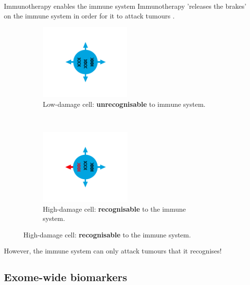 \documentclass{beamer}
\begin{document}
\begin{frame}{Immunotherapy enables the immune system}
Immunotherapy 'releases the brakes' on the immune system in order for it to attack tumours \citep{pardoll_blockade_2012}.
\begin{figure}[t!]
    \centering
    \begin{subfigure}[t]{0.45\textwidth}
        \centering
        \includegraphics[height=1.5in]{../results/figures/IC1.png}
        \caption{Low-damage cell: \textbf{unrecognisable} to immune system.}
    \end{subfigure}
    ~ 
    \begin{subfigure}[t]{0.45\textwidth}
        \centering
        \includegraphics[height=1.5in]{../results/figures/IC2.png}
        \caption{High-damage cell: \textbf{recognisable} to the immune system.}
    \end{subfigure}
\end{figure}
However, the immune system can only attack tumours that it recognises!
\end{frame}

\subsection{Exome-wide biomarkers}
\end{document}
